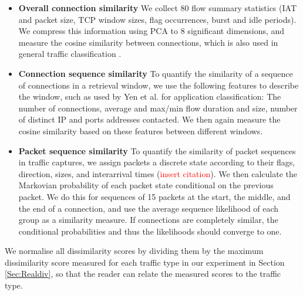 \documentclass[sigconf]{acmart}
\begin{document}
\begin{itemize}
\item \textbf{Overall connection similarity} We collect 80 flow summary statistics (IAT and packet size, TCP window sizes, flag occurrences, burst and idle periods). We compress this information using PCA to 8 significant dimensions, and measure the cosine similarity between connections, which is also used in general traffic classification \cite{aun2017review}.
\item \textbf{Connection sequence similarity} 
To quantify the similarity of a sequence of connections in a retrieval window, we use the following features to describe the window, such as used by Yen et al. \cite{yen2009browser} for application classification: The number of connections, average and max/min flow duration and size, number of distinct IP and ports addresses contacted. We then again measure the cosine similarity based on these features between different windows. 
\item \textbf{Packet sequence similarity} To quantify the similarity of packet sequences in traffic captures, we assign packets a discrete state according to their flags, direction, sizes, and interarrival times (\textcolor{red}{insert citation}). We then calculate the Markovian probability of each packet state conditional on the previous packet. We do this for sequences of 15 packets at the start, the middle, and the end of a connection, and use the average sequence likelihood of each group as a similarity measure. If connections are completely similar, the conditional probabilities and thus the likelihoods should converge to one.
\end{itemize}

We normalise all dissimilarity scores by dividing them by the maximum dissimilarity score measured for each traffic type in our experiment in Section \ref{Sec:Realdiv}, so that the reader can relate the measured scores to the traffic type.
\end{document}
